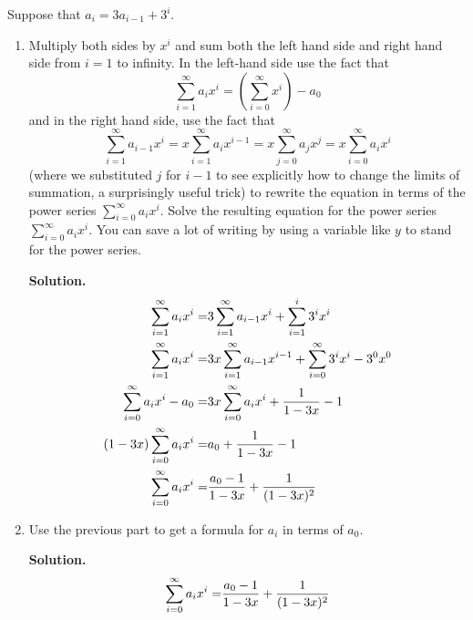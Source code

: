 \documentclass{book}
\begin{document}
\setcounter{project}{258}
\addtocounter{project}{-1}
\begin{activity}[]\label{substituteandsolve}
\hypertarget{p-1362}{}%
Suppose that \(a_i=3a_{i-1} + 3^i\).%
\begin{enumerate}[font=\bfseries,label=(\alph*),ref=\alph*]
\item\label{task-247} \hypertarget{p-1363}{}%
Multiply both sides by \(x^i\) and sum both the left hand side and right hand side from \(i=1\) to infinity.  In the left-hand side use the fact that%
\begin{equation*}
\sum_{i=1}^\infty a_ix^i = (\sum_{i=0}^\infty x^i) -a_0
\end{equation*}
and in the right hand side, use the fact that%
\begin{equation*}
\sum_{i=1}^\infty a_{i-1}x^i = x\sum_{i=1}^\infty a_ix^{i-1}
=x\sum_{j=0}^\infty a_jx^j =x\sum_{i=0}^\infty a_ix^i
\end{equation*}
(where we substituted \(j\) for \(i-1\) to see explicitly how to change the limits of summation, a surprisingly useful trick) to rewrite the equation in terms of the power series \(\sum_{i=0}^\infty a_ix^i\).  Solve the resulting equation for the power series \(\sum_{i=0}^\infty a_ix^i\). You can save a lot of writing by using a variable like \(y\) to stand for the power series.%
\par\smallskip%
\noindent\textbf{Solution.}\hypertarget{solution-168}{}\quad%
\hypertarget{p-1364}{}%
%
\begin{align*}
\sum_{i=1}^\infty a_ix^i  =& 3\sum_{i=1}^\infty
a_{i-1}x^i+\sum_{i=1}^i3^ix^i\\
\sum_{i=1}^\infty a_ix^i =& 3x\sum_{i=1}^\infty a_{i-1}x^{i-1}+
\sum_{i=0}^\infty 3^ix^i-3^0x^0\\
\sum_{i=0}^\infty a_ix^i -a_0 =& 3x\sum_{i=0}^\infty a_{i}x^{i}+
\frac{1}{1-3x}-1\\
(1-3x)\sum_{i=0}^\infty a_ix^i  =& a_0+\frac{1}{1-3x} -1\\
\sum_{i=0}^\infty a_ix^i  =& \frac{a_0-1}{1-3x}+\frac{1}{(1-3x)^2}
\end{align*}
%
\item\label{task-248} \hypertarget{p-1365}{}%
Use the previous part to get a formula for \(a_i\) in terms of \(a_0\).%
\par\smallskip%
\noindent\textbf{Solution.}\hypertarget{solution-169}{}\quad%
\hypertarget{p-1366}{}%
%
\begin{align*}
\sum_{i=0}^\infty a_i x^i  =\amp \frac{a_0-1}{1-3x} + \frac{1}{(1-3x)^2}\\

\end{align*}
\end{enumerate}
\end{activity}
\end{document}
